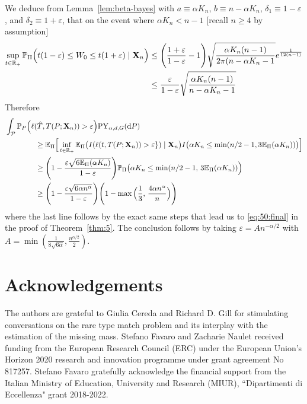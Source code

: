 \documentclass{article}
\newcommand{\1}{\boldsymbol{1}}
\newcommand{\EE}{\mathbb{E}}
\newcommand{\PP}{\mathbb{P}}
\theoremstyle{plain}
\begin{document}
  We deduce from Lemma~\ref{lem:beta-bayes} with $a \equiv \alpha K_n$, $b \equiv n - \alpha K_n$, $\delta_1 \equiv 1-\varepsilon$, and $\delta_2 \equiv 1+\varepsilon$, that on the event where $\alpha K_n < n-1$ [recall $n\geq 4$ by assumption]
  \begin{align*}
    \sup_{t\in \NNReals}\PP_{\Pi}\Big( t(1 - \varepsilon) \leq W_0 \leq t(1 + \varepsilon) \mid \mathbf{X}_n\Big)%
    &\leq \Bigg(\frac{1+\varepsilon}{1-\varepsilon} - 1\Bigg)\sqrt{\frac{\alpha K_n(n-1)}{2\pi(n-\alpha K_n-1}}e^{\frac{1}{12(n-1)}}\\
    &\leq \frac{\varepsilon}{1-\varepsilon}\sqrt{\frac{\alpha K_n(n-1)}{n-\alpha K_n-1}}
  \end{align*}
  Therefore
  \begin{align*}
    &\int_{\mathcal{P}}\PP_P\Big(\ell(\hat{T},T(P;\mathbf{X}_n)) > \varepsilon \Big) \mathrm{PY}_{\alpha,d,G}(\intd P)\\
    &\qquad\qquad\geq%
      \EE_{\Pi}\Big[\inf_{t\in \NNReals}\EE_{\Pi}\big(I( \ell(t,T(P;\mathbf{X}_n)) > \varepsilon\} ) \mid \mathbf{X}_n\big)I\big(\alpha K_n\leq \min(n/2-1,3 \EE_{\Pi}(\alpha K_n)) \big)\Big]\\
    &\qquad\qquad\geq%
      \Bigg(1 - \frac{\varepsilon\sqrt{6 \EE_{\Pi}(\alpha K_n)}}{1 - \varepsilon}\Bigg)\PP_{\Pi}\big(\alpha K_n \leq \min(n/2-1,\, 3\EE_{\Pi}(\alpha K_n)) \Big)\\
    &\qquad\qquad\geq \Bigg(1 - \frac{\varepsilon\sqrt{6 \alpha n^{\alpha}}}{1 - \varepsilon}\Bigg)\Bigg(1 - \max\Big(\frac{1}{3},\,\frac{4\alpha n^{\alpha}}{n} \Big)\Bigg)
  \end{align*}%
  where the last line follows by the exact same steps that lead us to \eqref{eq:50:final} in the proof of Theorem~\ref{thm:5}. The conclusion follows by taking $\varepsilon = An^{-\alpha/2}$ with $A = \min(\frac{1}{8\sqrt{6\alpha}},\frac{n^{\alpha/2}}{2})$.




\section*{Acknowledgements}

The authors are grateful to Giulia Cereda and Richard D. Gill for stimulating conversations on the rare type match problem and its interplay with the estimation of the missing mass. Stefano Favaro and Zacharie Naulet received funding from the European Research Council (ERC) under the European Union's Horizon 2020 research and innovation programme under grant agreement No 817257. Stefano Favaro gratefully acknowledge the financial support from the Italian Ministry of Education, University and Research (MIUR), ``Dipartimenti di Eccellenza" grant 2018-2022.
\end{document}
